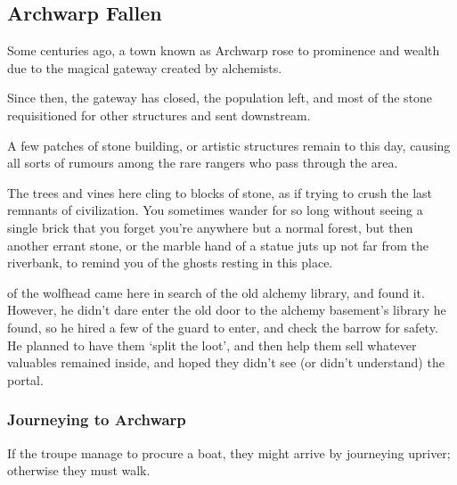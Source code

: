 \subsection{Archwarp Fallen}
\label{lostcity}

\begin{exampletext}
  Some centuries ago, a town known as Archwarp rose to prominence and wealth due to the magical gateway created by alchemists.

  Since then, the gateway has closed, the population left, and most of the stone requisitioned for other structures and sent downstream.

  A few patches of stone building, or artistic structures remain to this day, causing all sorts of rumours among the rare rangers who pass through the area.
\end{exampletext}

\begin{boxtext}
  The trees and vines here cling to blocks of stone, as if trying to crush the last remnants of civilization.
  You sometimes wander for so long without seeing a single brick that you forget you're anywhere but a normal forest, but then another errant stone, or the marble hand of a statue juts up not far from the riverbank, to remind you of the ghosts resting in this place.
\end{boxtext}

\begin{exampletext}
  \noindent
   of the \gls{wolfhead} came here in search of the old alchemy library, and found it.
  However, he didn't dare enter the old door to the alchemy basement's library he found, so he hired a few of the \gls{guard} to enter, and check the barrow for safety.
  He planned to have them `split the loot', and then help them sell whatever valuables remained inside, and hoped they didn't see (or didn't understand) the portal.
\end{exampletext}

\subsubsection*{Journeying to Archwarp}
If the troupe manage to procure a boat, they might arrive by journeying upriver; otherwise they must walk.

